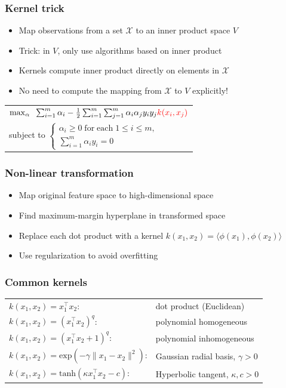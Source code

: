 \documentclass[10pt]{beamer}
\begin{document}
\begin{frame}
  \frametitle{Kernel trick}
  \begin{itemize}
    \item Map observations from a set $\mathcal{X}$ to an inner product space $V$
	\item {\color{red} Trick}: in $V$, only use algorithms based on inner product
	\item {\color{blue} Kernels} compute inner product directly on elements in $\mathcal{X}$
	\item No need to compute the mapping from $\mathcal{X}$ to $V$ explicitly!
  \end{itemize}
  \begin{tabular}{l}
	\vspace{.2cm}
    \hspace*{1cm}$\max_\alpha \;\; \sum_{i=1}^m\alpha_i-\frac{1}{2}\sum_{i=1}^m\sum_{j=1}^m\alpha_i\alpha_jy_iy_j {\color{red} k(x_i,x_j)}$\\
	\hspace*{1cm}subject to $\left\{\begin{array}{l}\alpha_i\geq 0\;\mathrm{for}\;\mathrm{each}\;1\leq i\leq m,\\\sum_{i=1}^m\alpha_iy_i=0\end{array}\right.$
  \end{tabular}
\end{frame}

\begin{frame}
  \frametitle{Non-linear transformation}
  \begin{itemize}
	\item Map original feature space to high-dimensional space
    \item Find maximum-margin hyperplane in transformed space
	\item Replace each dot product with a {\color{blue} kernel}
		$k(x_1,x_2)=\langle\phi(x_1),\phi(x_2)\rangle$
	\item Use regularization to avoid overfitting
  \end{itemize}
\end{frame}

\begin{frame}
  \frametitle{Common kernels}
  \begin{tabular}{ll}
	$k(x_1,x_2)=x_1^\top x_2$: & dot product (Euclidean)\\
	$k(x_1,x_2)=(x_1^\top x_2)^q$: & polynomial homogeneous\\
	$k(x_1,x_2)=(x_1^\top x_2 + 1)^q$: & polynomial inhomogeneous\\
	$k(x_1,x_2)=\mathrm{exp}(-\gamma\|x_1-x_2\|^2)$: & Gaussian radial basis, $\gamma>0$\\
	$k(x_1,x_2)=\mathrm{tanh}(\kappa x_1^\top x_2 - c)$: & Hyperbolic tangent, $\kappa,c>0$
  \end{tabular}
\end{frame}
\end{document}

